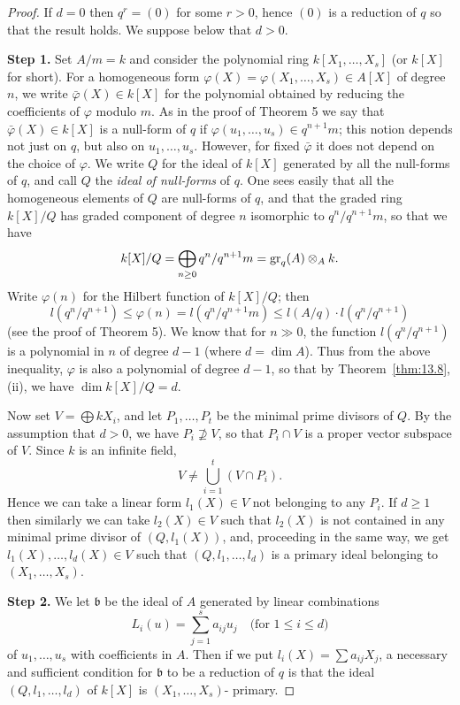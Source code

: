 \begin{proof}
If $d = 0$ then $q^r = (0)$ for some $r > 0$, hence $(0)$ is a reduction of $q$
so that the result holds. We suppose below that $d > 0$.

\textbf{Step 1.} Set $A/m = k$ and consider the polynomial ring $k[X_1, \ldots, X_s]$ (or
$k[X]$ for short). For a homogeneous form $\varphi(X) = \varphi(X_1, \ldots, X_s) \in A[X]$
of degree $n$, we write $\bar{\varphi}(X) \in k[X]$ for the polynomial obtained by
reducing the coefficients of $\varphi$ modulo $m$. As in the proof of Theorem 5 we say that
$\bar{\varphi}(X) \in k[X]$ is a null-form of $q$ if $\varphi(u_1, \ldots, u_s) \in q^{n+1}m$; this notion depends
not just on $q$, but also on $u_1, \ldots, u_s$. However, for fixed $\bar{\varphi}$ it does not
depend on the choice of $\varphi$. We write $Q$ for the ideal of $k[X]$ generated by
all the null-forms of $q$, and call $Q$ the \emph{ideal of null-forms} of $q$. One sees
easily that all the homogeneous elements of $Q$ are null-forms of $q$, and
that the graded ring $k[X]/Q$ has graded component of degree $n$ isomorphic
to $q^n/q^{n+1}m$, so that we have
\[
  k[X]/Q = \bigoplus_{n \ge 0} q^n/q^{n+1}m = \operatorname{gr}_q(A) \otimes_A k.
\]
Write $\varphi(n)$ for the Hilbert function of $k[X]/Q$; then
\[
  l(q^n/q^{n+1}) \le \varphi(n) = l(q^n/q^{n+1}m) \le l(A/q) \cdot l(q^n/q^{n+1})
\]
(see the proof of Theorem 5). We know that for $n \gg 0$, the function $l(q^n/q^{n+1})$
is a polynomial in $n$ of degree $d - 1$ (where $d = \dim A$). Thus from the
above inequality, $\varphi$ is also a polynomial of degree $d - 1$, so that by
Theorem~\ref{thm:13.8}, (ii), we have $\dim k[X]/Q = d$.

Now set $V = \bigoplus kX_i$, and let $P_1, \ldots, P_t$ be the minimal prime divisors of
$Q$. By the assumption that $d > 0$, we have $P_i \nsupseteq V$, so that $P_i \cap V$ is a
proper vector subspace of $V$. Since $k$ is an infinite field,
\[
  V \neq \bigcup_{i=1}^{t} (V \cap P_i).
\]
Hence we can take a linear form $l_1(X) \in V$ not belonging to any $P_i$. If
$d \ge 1$ then similarly we can take $l_2(X) \in V$ such that $l_2(X)$ is not contained
in any minimal prime divisor of $(Q, l_1(X))$, and, proceeding in the same
way, we get $l_1(X), \ldots, l_d(X) \in V$ such that $(Q, l_1, \ldots, l_d)$ is a primary ideal
belonging to $(X_1, \ldots, X_s)$.

\textbf{Step 2.} We let $\mathfrak{b}$ be the ideal of $A$ generated by linear combinations
\[
  L_i(u) = \sum_{j=1}^{s} a_{ij}u_j \quad \text{(for } 1 \le i \le d\text{)}
\]
of $u_1, \ldots, u_s$ with coefficients in $A$. Then if we
put $l_i(X) = \sum a_{ij}X_j$, a necessary and sufficient condition for $\mathfrak{b}$ to be
a reduction of $q$ is that the ideal $(Q, l_1, \ldots, l_d)$ of $k[X]$ is $(X_1, \ldots, X_s)$-
primary.


\end{proof}
